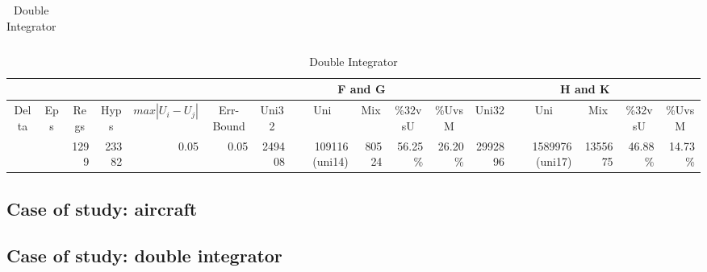 \begin{landscape}
\begin{table}[p]
\begin{tabular}{rrrrrrrrrrrrrrrr}
	\end{tabular}
	\vspace*{1 cm}
	\centering
	\caption{Double Integrator}
	\label{tab:di}
	\begin{tabular}{rrrrrrrrrrrrrrrr}
		\cline{7-11}
		\cline{12-16}
		\multicolumn{4}{c}{} &
		\multicolumn{2}{c}{} &
		\multicolumn{5}{c|}{F and G} &
		\multicolumn{5}{c}{H and K} \\
		\hline
		\multicolumn{1}{c}{Delta}&
		\multicolumn{1}{c}{Eps} &
		\multicolumn{1}{c}{Regs} &
		\multicolumn{1}{c}{Hyps} &
		\multicolumn{1}{c}{$max|U_{i}-U_{j}|$} &
		\multicolumn{1}{c}{Err-Bound} &
		\multicolumn{1}{c}{Uni32}&
		\multicolumn{1}{c}{Uni}&
		\multicolumn{1}{c}{Mix}&
		\multicolumn{1}{c}{\%32vsU}&
		\multicolumn{1}{c}{\%UvsM}&
		\multicolumn{1}{c}{Uni32}&
		\multicolumn{1}{c}{Uni}&
		\multicolumn{1}{c}{Mix}&
		\multicolumn{1}{c}{\%32vsU}&
		\multicolumn{1}{c}{\%UvsM} \\
		\hline
		\color{red}{0.1} & \color{red}{0.001} & 1299 & 23382 & 0.05 & 0.05 & 249408 & 109116 (uni14) & 80524 & 56.25\% & 26.20\% & 2992896 & 1589976 (uni17) & 1355675 & 46.88\% & 14.73\% \\
	\end{tabular}
\end{table}
\end{landscape}

\subsection{Case of study: aircraft}
\subsection{Case of study: double integrator}
